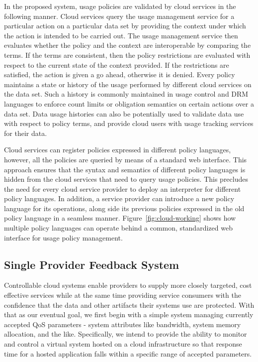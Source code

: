 \documentclass[10pt,letterpaper]{book}
\begin{document}
In the proposed system, usage policies are validated by cloud services in the following manner. Cloud services query the usage management service for a particular action on a particular data set by providing the context under which the action is intended to be carried out. The usage management service then evaluates whether the policy and the context are interoperable by comparing the terms. If the terms are consistent, then the policy restrictions are evaluated with respect to the current state of the context provided. If the restrictions are satisfied, the action is given a go ahead, otherwise it is denied. Every policy maintains a state or history of the usage performed by different cloud services on the data set. Such a history is commonly maintained in usage control and DRM languages to enforce count limits or obligation semantics on certain actions over a data set. Data usage histories can also be potentially used to validate data use with respect to policy terms, and provide cloud users with usage tracking services for their data.

Cloud services can register policies expressed in different policy languages,  however, all the policies are queried by means of a standard web interface. This approach ensures that the syntax and semantics of different policy languages is hidden from the cloud services that need to query usage policies. This precludes the need for every cloud service provider to deploy an interpreter for different policy languages. In addition, a service provider can introduce a new policy language for its operations, along side its previous policies expressed in the old policy language in a seamless manner. Figure~\ref{fig:cloud-working} shows how multiple policy languages can operate behind a common, standardized web interface for usage policy management.

\subsection{Single Provider Feedback System}\label{sec:single}
Controllable cloud systems enable providers to supply more closely targeted, cost effective services while at the same time providing service consumers with the confidence that the data and other artifacts their systems use are protected.  With that as our eventual goal, we first begin with a simple system managing currently accepted QoS parameters - system attributes like bandwidth, system memory allocation, and the like.  Specifically, we intend to provide the ability to monitor and control a virtual system hosted on a cloud infrastructure so that response time for a hosted application falls within a specific range of accepted parameters.
\end{document}
